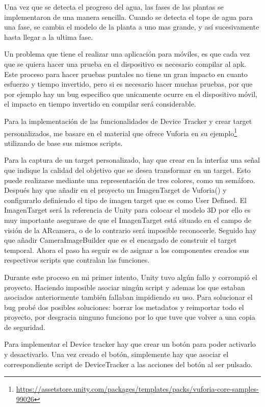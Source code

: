 Una vez que se detecta el progreso del agua, las fases de las plantas se implementaron de una manera sencilla. Cuando se detecta el tope de agua para una fase, se cambia el modelo de la planta a uno mas grande, y así sucesivamente hasta llegar a la ultima fase.

Un problema que tiene el realizar una aplicación para móviles, es que cada vez que se quiera hacer una prueba en el dispositivo es necesario compilar al apk. Este proceso para hacer pruebas puntales no tiene un gran impacto en cuanto esfuerzo y tiempo invertido, pero si es necesario hacer muchas pruebas, por que por ejemplo hay un bug especifico que unicamente ocurre en el dispositivo móvil, el impacto en tiempo invertido en compilar será considerable.


Para la implementación de las funcionalidades de Device Tracker y crear target personalizados, me basare en el material que ofrece Vuforia en su ejemplo\footnote{\url{https://assetstore.unity.com/packages/templates/packs/vuforia-core-samples-99026}} utilizando de base sus mismos scripts.

Para la captura de un target personalizado, hay que crear en la interfaz una señal que indique la calidad del objetivo que se desea transformar en un target.
Esto puede realizarse mediante una representación de tres colores, como un semáforo.
Después hay que añadir en el proyecto un ImagenTarget de Vuforia() y configurarlo definiendo el tipo de imagen target que es como User Defined. El ImagenTarget será la referencia de Unity para colocar el modelo 3D por ello es muy importante asegurase de que el ImagenTarget está situado en el campo de visión de la ARcamera, o de lo contrario será imposible reconocerle. 
Seguido hay que añadir CameraImageBuilder que es el encargado de construir el target temporal. 
Ahora el paso ha seguir es de asignar a los componentes creados sus respectivos scripts que contralan las funciones. 

Durante este proceso en mi primer intento, Unity tuvo algún fallo y corrompió el proyecto. Haciendo imposible asociar ningún script y ademas los que estaban asociados anteriormente también fallaban impidiendo su uso. Para solucionar el bug probé dos posibles soluciones: borrar los metadatos y reimportar todo el proyecto, por desgracia ninguno funciono por lo que tuve que volver a una copia de seguridad.


Para implementar el Device tracker hay que crear un botón para poder activarlo y desactivarlo. Una vez creado el botón, simplemente hay que asociar el correspondiente script de DeviceTracker a las acciones del botón al ser pulsado.


